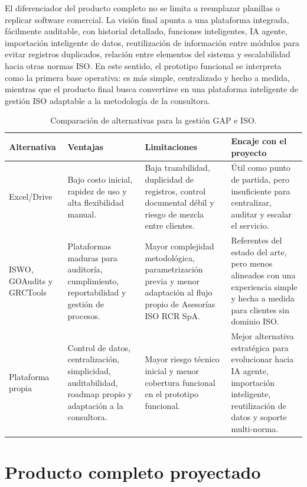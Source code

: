 \documentclass[final]{udpthesis}
\begin{document}
El diferenciador del producto completo no se limita a reemplazar planillas o replicar software comercial. La visión final apunta a una plataforma integrada, fácilmente auditable, con historial detallado, funciones inteligentes, IA agente, importación inteligente de datos, reutilización de información entre módulos para evitar registros duplicados, relación entre elementos del sistema y escalabilidad hacia otras normas ISO. En este sentido, el prototipo funcional se interpreta como la primera base operativa: es más simple, centralizado y hecho a medida, mientras que el producto final busca convertirse en una plataforma inteligente de gestión ISO adaptable a la metodología de la consultora.

\begin{table}[H]
\centering
\small
\begin{tabularx}{\textwidth}{|L{2.4cm}|Y|Y|Y|}
\hline
{}\textbf{Alternativa} & \textbf{Ventajas} & \textbf{Limitaciones} & \textbf{Encaje con el proyecto} \\ \hline
Excel/Drive & Bajo costo inicial, rapidez de uso y alta flexibilidad manual. & Baja trazabilidad, duplicidad de registros, control documental débil y riesgo de mezcla entre clientes. & Útil como punto de partida, pero insuficiente para centralizar, auditar y escalar el servicio. \\ \hline
ISWO, GOAudits y GRCTools & Plataformas maduras para auditoría, cumplimiento, reportabilidad y gestión de procesos. & Mayor complejidad metodológica, parametrización previa y menor adaptación al flujo propio de Asesorías ISO RCR SpA. & Referentes del estado del arte, pero menos alineados con una experiencia simple y hecha a medida para clientes sin dominio ISO. \\ \hline
Plataforma propia & Control de datos, centralización, simplicidad, auditabilidad, roadmap propio y adaptación a la consultora. & Mayor riesgo técnico inicial y menor cobertura funcional en el prototipo funcional. & Mejor alternativa estratégica para evolucionar hacia IA agente, importación inteligente, reutilización de datos y soporte multi-norma. \\ \hline
\end{tabularx}
\normalsize
\caption{Comparación de alternativas para la gestión GAP e ISO.}
\label{tab:alternativas}
\end{table}

\section{Producto completo proyectado}
\end{document}
